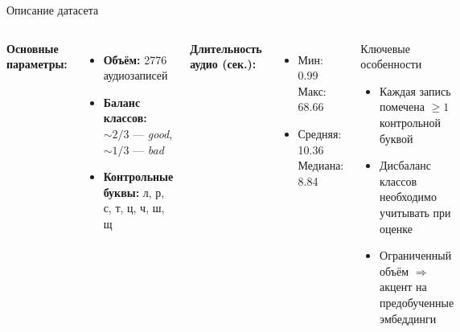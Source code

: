 \documentclass[aspectratio=169]{beamer}
\begin{document}
\begin{frame}{Описание датасета}
  \begin{columns}[T]
      \textbf{Основные параметры:}
      \begin{itemize}
        \item \textbf{Объём:} 2776 аудиозаписей
        \item \textbf{Баланс классов:} ${\sim}2/3$ — \textit{good}, ${\sim}1/3$ — \textit{bad}
        \item \textbf{Контрольные буквы:} л, р, с, т, ц, ч, ш, щ
      \end{itemize}
      \vspace{0.5em}
      \textbf{Длительность аудио (сек.):}
      \begin{itemize}
        \item Мин: 0.99 \quad Макс: 68.66
        \item Средняя: 10.36 \quad Медиана: 8.84
      \end{itemize}
      \begin{block}{Ключевые особенности}
        \small
        \begin{itemize}
          \item Каждая запись помечена ${\geq}1$ контрольной буквой
          \item Дисбаланс классов необходимо учитывать при оценке
          \item Ограниченный объём $\Rightarrow$ акцент на предобученные эмбеддинги
        \end{itemize}
      \end{block}
  \end{columns}
\end{frame}
\end{document}
